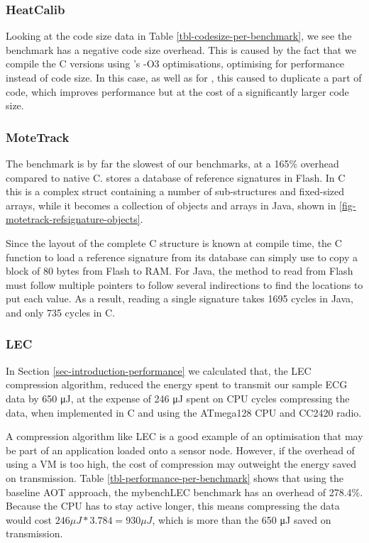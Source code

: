 \subsubsection{HeatCalib}
Looking at the code size data in Table \ref{tbl-codesize-per-benchmark}, we see the  benchmark has a negative code size overhead. This is caused by the fact that we compile the C versions using 's -O3 optimisations, optimising for performance instead of code size. In this case, as well as for , this caused  to duplicate a part of code, which improves performance but at the cost of a significantly larger code size.

\subsubsection{MoteTrack}
The  benchmark is by far the slowest of our benchmarks, at a 165\% overhead compared to native C.  stores a database of reference signatures in Flash. In C this is a complex struct containing a number of sub-structures and fixed-sized arrays, while it becomes a collection of objects and arrays in Java, shown in \ref{fig-motetrack-refsignature-objects}.

Since the layout of the complete C structure is known at compile time, the C function to load a reference signature from its database can simply use  to copy a block of 80 bytes from Flash to RAM. For Java, the method to read from Flash must follow multiple pointers to follow several indirections to find the locations to put each value. As a result, reading a single signature takes 1695 cycles in Java, and only 735 cycles in C.

\subsubsection{LEC}
In Section \ref{sec-introduction-performance} we calculated that, the LEC compression algorithm, reduced the energy spent to transmit our sample ECG data by 650 μJ, at the expense of 246 μJ spent on CPU cycles compressing the data, when implemented in C and using the ATmega128 CPU and CC2420 radio.

A compression algorithm like LEC is a good example of an optimisation that may be part of an application loaded onto a sensor node. However, if the overhead of using a VM is too high, the cost of compression may outweight the energy saved on transmission. Table \ref{tbl-performance-per-benchmark} shows that using the baseline AOT approach, the mybench{LEC} benchmark has an overhead of 278.4\%. Because the CPU has to stay active longer, this means compressing the data would cost $246 \mu J * 3.784 = 930 \mu J$, which is more than the 650 μJ saved on transmission.

